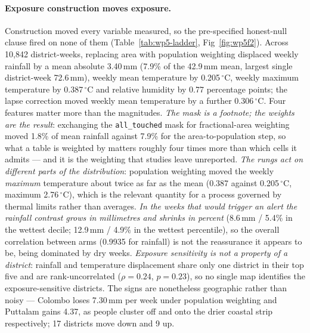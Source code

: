 \documentclass[11pt,a4paper]{article}
\begin{document}
\paragraph{Exposure construction moves exposure.} Construction moved every variable measured, so the pre-specified honest-null clause fired on none of them (Table~\ref{tab:wp5-ladder}, Fig~\ref{fig:wp5f2}). Across 10{,}842 district-weeks, replacing area with population weighting displaced weekly rainfall by a mean absolute 3.40\,mm (7.9\% of the 42.9\,mm mean, largest single district-week 72.6\,mm), weekly mean temperature by 0.205\,$^{\circ}$C, weekly maximum temperature by 0.387\,$^{\circ}$C and relative humidity by 0.77 percentage points; the lapse correction moved weekly mean temperature by a further 0.306\,$^{\circ}$C. Four features matter more than the magnitudes. \emph{The mask is a footnote; the weights are the result}: exchanging the \texttt{all\_touched} mask for fractional-area weighting moved 1.8\% of mean rainfall against 7.9\% for the area-to-population step, so what a table is weighted by matters roughly four times more than which cells it admits --- and it is the weighting that studies leave unreported. \emph{The rungs act on different parts of the distribution}: population weighting moved the weekly \emph{maximum} temperature about twice as far as the mean (0.387 against 0.205\,$^{\circ}$C, maximum 2.76\,$^{\circ}$C), which is the relevant quantity for a process governed by thermal limits rather than averages. \emph{In the weeks that would trigger an alert the rainfall contrast grows in millimetres and shrinks in percent} (8.6\,mm / 5.4\% in the wettest decile; 12.9\,mm / 4.9\% in the wettest percentile), so the overall correlation between arms (0.9935 for rainfall) is not the reassurance it appears to be, being dominated by dry weeks. \emph{Exposure sensitivity is not a property of a district}: rainfall and temperature displacement share only one district in their top five and are rank-uncorrelated ($\rho=0.24$, $p=0.23$), so no single map identifies the exposure-sensitive districts. The signs are nonetheless geographic rather than noisy --- Colombo loses 7.30\,mm per week under population weighting and Puttalam gains 4.37, as people cluster off and onto the drier coastal strip respectively; 17 districts move down and 9 up.
\end{document}
